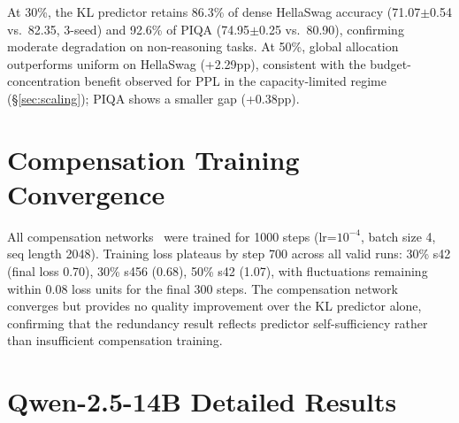 At 30\%, the KL predictor retains 86.3\% of dense HellaSwag accuracy (71.07$\pm$0.54 vs.\ 82.35, 3-seed) and 92.6\% of PIQA (74.95$\pm$0.25 vs.\ 80.90), confirming moderate degradation on non-reasoning tasks.
At 50\%, global allocation outperforms uniform on HellaSwag (+2.29pp), consistent with the budget-concentration benefit observed for PPL in the capacity-limited regime (\S\ref{sec:scaling}); PIQA shows a smaller gap (+0.38pp).


\section{Compensation Training Convergence}
\label{app:comp_convergence}

All compensation networks~\cite{gautam2026fastforward} were trained for 1000 steps (lr=$10^{-4}$, batch size 4, seq length 2048). Training loss plateaus by step 700 across all valid runs: 30\% s42 (final loss 0.70), 30\% s456 (0.68), 50\% s42 (1.07), with fluctuations remaining within 0.08 loss units for the final 300 steps. The compensation network converges but provides no quality improvement over the KL predictor alone, confirming that the redundancy result reflects predictor self-sufficiency rather than insufficient compensation training.


\section{Qwen-2.5-14B Detailed Results}
\label{app:14b}


